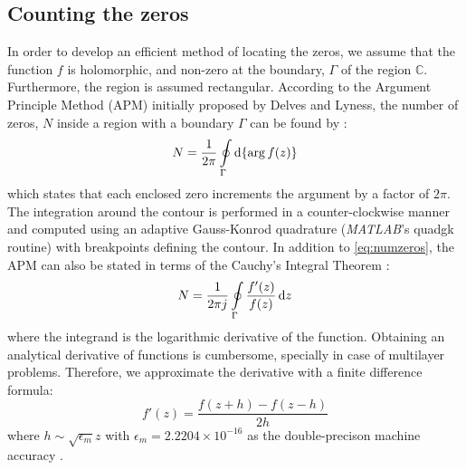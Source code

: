 \documentclass[12pt]{article}
\begin{document}
\subsection*{Counting the zeros}
In order to develop an efficient method of locating the zeros, we assume that the function $f$ is holomorphic, and non-zero at the boundary, $\Gamma$ of the region $\mathbb{C}$. Furthermore, the region is assumed rectangular. According to the Argument Principle Method (APM) initially proposed by Delves and Lyness, the number of zeros, $N$ inside a region with a boundary $\Gamma$ can be found by \cite{Delves1967c,Carpentier1982c,Gillan2006c}:
%
\begin{equation}
  N = \frac{1}{2 \pi} \oint \limits_{\Gamma} \dif {\{ \arg f(z)\} }
  \label{eq:numzeros}
\end{equation}
%
which states that each enclosed zero increments the argument by a factor of $2 \pi$. The integration around the contour is performed in a counter-clockwise manner and computed using an adaptive Gauss-Konrod quadrature (\emph{MATLAB}'s quadgk routine) with breakpoints defining the contour. In addition to \eqref{eq:numzeros}, the APM can also be stated in terms of the Cauchy's Integral Theorem \cite[pg. 71]{Krantz1999}:
%
\begin{equation}
  N = \frac{1}{2 \pi j} \oint \limits_{\Gamma} \frac{f'(z)}{f(z)} \dif z
  \label{eq:cauchyth}
\end{equation}
%
where the integrand is the logarithmic derivative of the function. Obtaining an analytical derivative of functions is cumbersome, specially in case of multilayer problems. Therefore, we approximate the derivative with a finite difference formula:
%
\begin{equation}
  f'(z) = \frac{f(z + h) - f(z - h)}{2 h}
  \label{eq:FD}
\end{equation}
%
where $h \sim \sqrt{\epsilon_m}z$ with $\epsilon_m = 2.2204 \times 10^{-16}$ as the double-precison machine accuracy \cite[pg. 230]{press2007numerical}.
%
\end{document}
